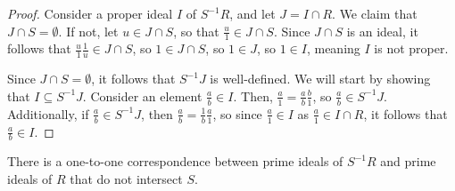 \documentclass[10pt]{mypackage}
\begin{document}
\begin{proof}
  Consider a proper ideal $I$ of $S^{-1}R$, and let $J = I\cap R$. We claim that $J\cap S = \emptyset$. If not, let $u\in J\cap S$, so that $\frac{u}{1}\in J\cap S$. Since $J\cap S$ is an ideal, it follows that $\frac{u}{1}\frac{1}{u}\in J\cap S$, so $1\in J\cap S$, so $1\in J$, so $1\in I$, meaning $I$ is not proper.

  Since $J\cap S = \emptyset$, it follows that $S^{-1}J$ is well-defined. We will start by showing that $I\subseteq S^{-1}J$. Consider an element $\frac{a}{b}\in I$. Then, $\frac{a}{1} = \frac{a}{b}\frac{b}{1}$, so $\frac{a}{b}\in S^{-1}J$. Additionally, if $\frac{a}{b}\in S^{-1}J$, then $\frac{a}{b} = \frac{1}{b}\frac{a}{1}$, so since $\frac{a}{1}\in I$ as $\frac{a}{1}\in I\cap R$, it follows that $\frac{a}{b}\in I$.
\end{proof}
\begin{proposition}
  There is a one-to-one correspondence between prime ideals of $S^{-1}R$ and prime ideals of $R$ that do not intersect $S$.
\end{proposition}
\end{document}
